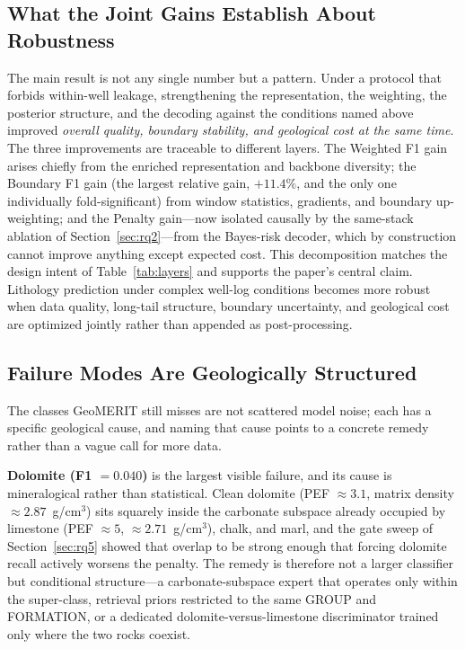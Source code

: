 \documentclass[bdcc,article,submit,pdftex,moreauthors]{Definitions/mdpi}
\begin{document}
\subsection{What the Joint Gains Establish About Robustness}
\label{sec:joint}
The main result is not any single number but a pattern. Under a protocol that forbids
within-well leakage, strengthening the representation, the weighting, the posterior structure,
and the decoding against the conditions named above improved \emph{overall quality, boundary
stability, and geological cost at the same time}. The three improvements are
traceable to different layers. The Weighted F1 gain arises chiefly from the
enriched representation and backbone diversity; the Boundary F1 gain (the largest relative
gain, $+11.4\%$, and the only one individually fold-significant) from window statistics,
gradients, and boundary up-weighting; and the Penalty gain---now isolated causally by the
same-stack ablation of Section~\ref{sec:rq2}---from the Bayes-risk decoder, which by
construction cannot improve anything except expected cost. This decomposition matches the
design intent of Table~\ref{tab:layers} and supports the paper's central claim. Lithology
prediction under complex well-log conditions becomes more robust when data quality,
long-tail structure, boundary uncertainty, and geological cost are optimized jointly rather
than appended as post-processing.

\subsection{Failure Modes Are Geologically Structured}
\label{sec:failures}
The classes GeoMERIT still misses are not scattered model noise; each has a specific geological
cause, and naming that cause points to a concrete remedy rather than a vague call for more data.

\textbf{Dolomite (F1 $=0.040$)} is the largest visible failure, and its cause is mineralogical
rather than statistical. Clean dolomite (PEF $\approx 3.1$, matrix density
$\approx 2.87$~g/cm$^3$) sits squarely inside the carbonate subspace already occupied by
limestone (PEF $\approx 5$, $\approx 2.71$~g/cm$^3$), chalk, and marl, and the gate sweep of
Section~\ref{sec:rq5} showed that overlap to be strong enough that forcing dolomite recall
actively worsens the penalty. The remedy is therefore not a larger classifier but conditional
structure---a carbonate-subspace expert that operates only within the super-class, retrieval
priors restricted to the same GROUP and FORMATION, or a dedicated dolomite-versus-limestone
discriminator trained only where the two rocks coexist.
\end{document}

